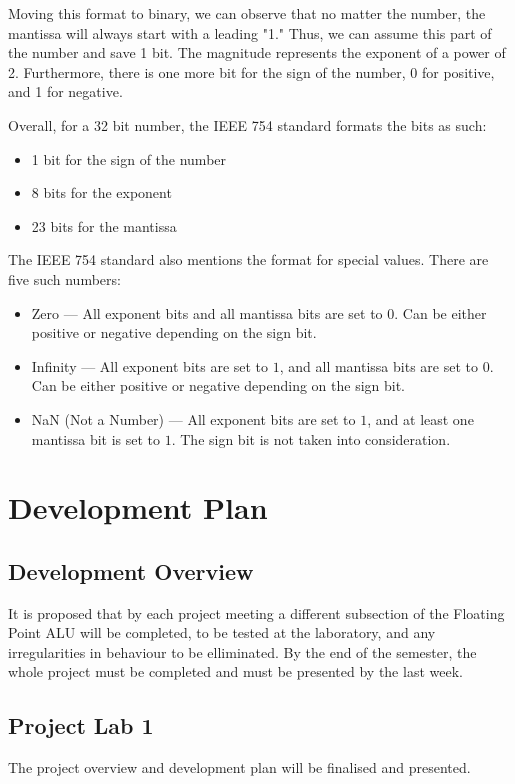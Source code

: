 \documentclass[a4paper,10pt]{article}
\begin{document}
    Moving this format to binary, we can observe that no matter the number, the mantissa will always start with a leading "1." Thus, we can assume this part of the number and save 1 bit. The magnitude represents the exponent of a power of 2. Furthermore, there is one more bit for the sign of the number, 0 for positive, and 1 for negative.

    Overall, for a 32 bit number, the IEEE 754 standard formats the bits as such:
    \begin{itemize}
     \item 1 bit for the sign of the number
     \item 8 bits for the exponent
     \item 23 bits for the mantissa
    \end{itemize}

    The IEEE 754 standard also mentions the format for special values. There are five such numbers:
    \begin{itemize}
     \item Zero --- All exponent bits and all mantissa bits are set to $0$. Can be either positive or negative depending on the sign bit.
     \item Infinity --- All exponent bits are set to $1$, and all mantissa bits are set to $0$. Can be either positive or negative depending on the sign bit.
     \item NaN (Not a Number) --- All exponent bits are set to $1$, and at least one mantissa bit is set to $1$. The sign bit is not taken into consideration.
    \end{itemize}


    \section{Development Plan}
    \subsection{Development Overview}
    It is proposed that by each project meeting a different subsection of the Floating Point ALU will be completed, to be tested at the laboratory, and any irregularities in behaviour to be elliminated. By the end of the semester, the whole project must be completed and must be presented by the last week.

    \subsection{Project Lab 1}
    The project overview and development plan will be finalised and presented.
\end{document}
